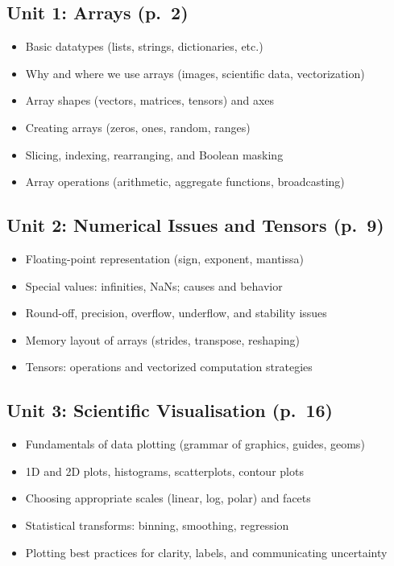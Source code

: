 \documentclass{article}
\begin{document}
\subsection*{Unit 1: Arrays (p.~2)}
\begin{itemize}
    \item Basic datatypes (lists, strings, dictionaries, etc.) 
    \item Why and where we use arrays (images, scientific data, vectorization) 
    \item Array shapes (vectors, matrices, tensors) and axes 
    \item Creating arrays (zeros, ones, random, ranges) 
    \item Slicing, indexing, rearranging, and Boolean masking 
    \item Array operations (arithmetic, aggregate functions, broadcasting) 
\end{itemize}

\subsection*{Unit 2: Numerical Issues and Tensors (p.~9)}
\begin{itemize}
    \item Floating-point representation (sign, exponent, mantissa) 
    \item Special values: infinities, NaNs; causes and behavior 
    \item Round-off, precision, overflow, underflow, and stability issues 
    \item Memory layout of arrays (strides, transpose, reshaping) 
    \item Tensors: operations and vectorized computation strategies
\end{itemize}

\subsection*{Unit 3: Scientific Visualisation (p.~16)}
\begin{itemize}
    \item Fundamentals of data plotting (grammar of graphics, guides, geoms) 
    \item 1D and 2D plots, histograms, scatterplots, contour plots 
    \item Choosing appropriate scales (linear, log, polar) and facets 
    \item Statistical transforms: binning, smoothing, regression 
    \item Plotting best practices for clarity, labels, and communicating uncertainty
\end{itemize}
\end{document}
